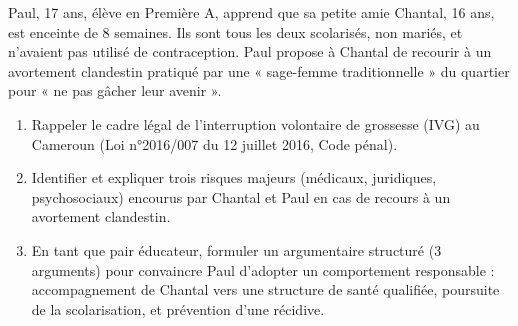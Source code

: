 \documentclass[11pt]{article}
\begin{document}
\begin{exercice}
Paul, 17 ans, élève en Première A, apprend que sa petite amie Chantal, 16 ans, est enceinte de 8 semaines. Ils sont tous les deux scolarisés, non mariés, et n'avaient pas utilisé de contraception. Paul propose à Chantal de recourir à un avortement clandestin pratiqué par une « sage-femme traditionnelle » du quartier pour « ne pas gâcher leur avenir ».
\begin{enumerate}
    \item Rappeler le cadre légal de l'interruption volontaire de grossesse (IVG) au Cameroun (Loi n°2016/007 du 12 juillet 2016, Code pénal).
    \item Identifier et expliquer trois risques majeurs (médicaux, juridiques, psychosociaux) encourus par Chantal et Paul en cas de recours à un avortement clandestin.
    \item En tant que pair éducateur, formuler un argumentaire structuré (3 arguments) pour convaincre Paul d'adopter un comportement responsable : accompagnement de Chantal vers une structure de santé qualifiée, poursuite de la scolarisation, et prévention d'une récidive.
\end{enumerate}
\end{exercice}
\end{document}
